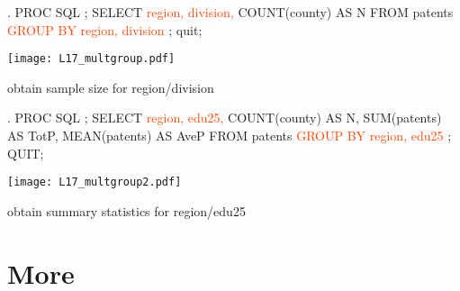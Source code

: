 \begin{frame}[fragile]
\hspace*{-0.3in}
\begin{code}{.}
PROC SQL ;
   SELECT
      \textcolor{OrangeRed}{region, division,}
      COUNT(county) AS N
   FROM patents
   \textcolor{OrangeRed}{GROUP BY region, division}
   ;
quit;
\end{code}
\emp
\blankcolumn
{}
\texttt{[image: L17\_multgroup.pdf]}
\emp
\bi
\item[]
\item obtain sample size for region/division
\ei
\end{frame}

\begin{frame}[fragile]
\hspace*{-0.35in}
\begin{code}{.}
PROC SQL ;
   SELECT
      \textcolor{OrangeRed}{region, edu25,}
      COUNT(county) AS N,
      SUM(patents) AS TotP,
      MEAN(patents) AS AveP
   FROM patents
   \textcolor{OrangeRed}{GROUP BY region, edu25}
   ;
QUIT;
\end{code}
\emp
\blankcolumn
{}
\texttt{[image: L17\_multgroup2.pdf]}
\emp
\bi
\item[]
\item obtain summary statistics for region/edu25
\ei
\end{frame}

\section[More]{More}
\subsection{}
\begin{frame}
\end{frame}


